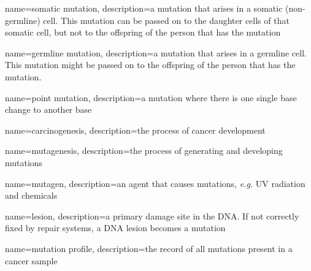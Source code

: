 {
        name=somatic mutation,
        description={a mutation that arises in a somatic (non-germline) cell. This mutation can be passed on to the daughter cells of that somatic cell, but not to the offspring of the person that has the mutation}
}

{
        name=germline mutation,
        description={a mutation that arises in a germline cell. This mutation might be passed on to the offspring of the person that has the mutation.}
}

{
        name=point mutation,
        description={a mutation where there is one single base change to another base}
}

{
        name=carcinogenesis,
        description={the process of cancer development}
}

{
        name=mutagenesis,
        description={the process of generating and developing mutations}
}

{
        name=mutagen,
        description={an agent that causes mutations, \textit{e.g.} UV radiation and chemicals}
}

{
        name=lesion,
        description={a primary damage site in the DNA. If not correctly fixed by repair systems, a DNA lesion becomes a mutation}
}

{
        name=mutation profile,
        description={the record of all mutations present in a cancer sample}
}